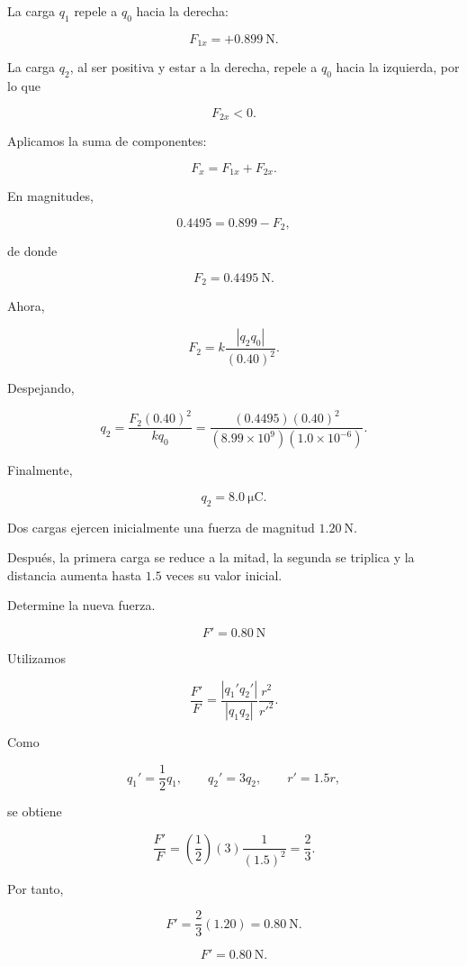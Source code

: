 \begin{explicacion}
La carga \(q_1\) repele a \(q_0\) hacia la derecha:

\[
F_{1x}=+\SI{0.899}{\newton}.
\]

La carga \(q_2\), al ser positiva y estar a la derecha, repele a \(q_0\)
hacia la izquierda, por lo que

\[
F_{2x}<0.
\]

Aplicamos la suma de componentes:

\[
F_x=F_{1x}+F_{2x}.
\]

En magnitudes,

\[
0.4495=0.899-F_2,
\]

de donde

\[
F_2=\SI{0.4495}{\newton}.
\]

Ahora,

\[
F_2=k\frac{|q_2q_0|}{(0.40)^2}.
\]

Despejando,

\[
q_2=
\frac{F_2(0.40)^2}{kq_0}
=
\frac{(0.4495)(0.40)^2}
{(8.99\times10^9)(1.0\times10^{-6})}.
\]

Finalmente,

\[
\boxed{q_2=\SI{8.0}{\micro\coulomb}}.
\]
\end{explicacion}


\begin{ejercicio}
Dos cargas ejercen inicialmente una fuerza de magnitud
\(\SI{1.20}{\newton}\).

Después, la primera carga se reduce a la mitad, la segunda se triplica y la
distancia aumenta hasta \(1.5\) veces su valor inicial.

Determine la nueva fuerza.
\end{ejercicio}

\begin{respuesta}
\[
\boxed{F'=\SI{0.80}{\newton}}
\]
\end{respuesta}

\begin{explicacion}
Utilizamos

\[
\frac{F'}{F}
=
\frac{|q_1'q_2'|}{|q_1q_2|}
\frac{r^2}{r'^2}.
\]

Como

\[
q_1'=\frac12q_1, \qquad q_2'=3q_2, \qquad r'=1.5r,
\]

se obtiene

\[
\frac{F'}{F}
=
\left(\frac12\right)(3)\frac{1}{(1.5)^2}
=
\frac23.
\]

Por tanto,

\[
F'=\frac23(1.20)=\SI{0.80}{\newton}.
\]

\[
\boxed{F'=\SI{0.80}{\newton}}.
\]
\end{explicacion}


